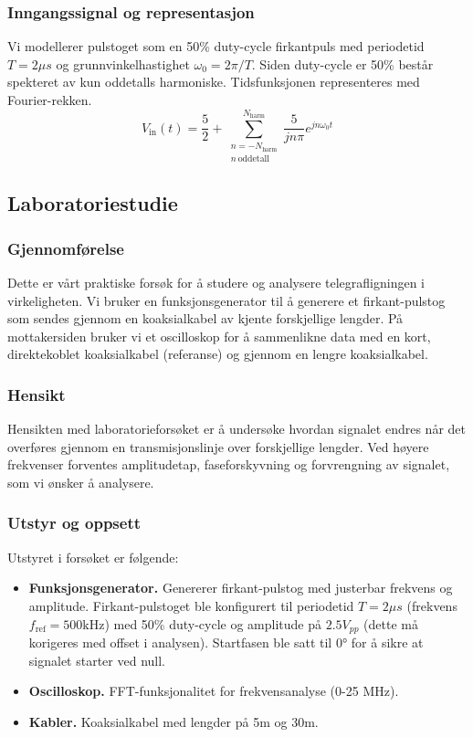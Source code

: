 \subsubsection{Inngangssignal og representasjon}
Vi modellerer pulstoget som en 50\% duty-cycle firkantpuls med periodetid $T = 2 \mu s$ og grunnvinkelhastighet $\omega_0 = 2\pi / T$. Siden duty-cycle er 50\% består spekteret av kun oddetalls harmoniske. Tidsfunksjonen representeres med Fourier-rekken.
\begin{equation}
    V_{\mathrm{in}}(t) = \frac{5}{2} + \sum_{\substack{n=-N_{\mathrm{harm}}\\ n\ \text{oddetall}}}^{N_{\mathrm{harm}}}\frac{5}{jn\pi} e^{jn\omega_0 t}
\end{equation} 
\clearpage

\subsection{Laboratoriestudie}
\subsubsection{Gjennomførelse} Dette er vårt praktiske forsøk for å studere og analysere telegrafligningen i virkeligheten. Vi bruker en funksjonsgenerator til å generere et firkant-pulstog som sendes gjennom en koaksialkabel av kjente forskjellige lengder. På mottakersiden bruker vi et oscilloskop for å sammenlikne data med en kort, direktekoblet koaksialkabel (referanse) og gjennom en lengre koaksialkabel.

\subsubsection{Hensikt} Hensikten med laboratorieforsøket er å undersøke hvordan signalet endres når det overføres gjennom en transmisjonslinje over forskjellige lengder. Ved høyere frekvenser forventes amplitudetap, faseforskyvning og forvrengning av signalet, som vi ønsker å analysere.
\subsubsection{Utstyr og oppsett}
Utstyret i forsøket er følgende:\\
\begin{itemize}
    \item \textbf{Funksjonsgenerator.} Genererer firkant-pulstog med justerbar frekvens og amplitude. Firkant-pulstoget ble konfigurert til periodetid $T = 2 \mu s$ (frekvens $f_\mathrm{ref} = 500 \mathrm{kHz}$) med 50\% duty-cycle og amplitude på $2.5V_{pp}$ (dette må korigeres med offset i analysen). Startfasen ble satt til $0\si{\degree}$ for å sikre at signalet starter ved null.\\
    \item \textbf{Oscilloskop.} FFT-funksjonalitet for frekvensanalyse (0-25 MHz).\\
    \item \textbf{Kabler.} Koaksialkabel med lengder på 5m og 30m.
\end{itemize}

